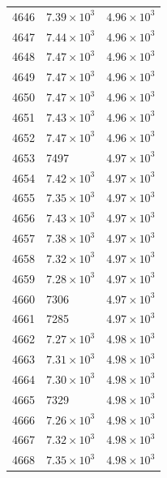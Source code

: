 \begin{table}[H]
\begin{tabular}{lll}
4646 & $\displaystyle 7.39 \times 10^{3}$ & $\displaystyle 4.96 \times 10^{3}$ \\
4647 & $\displaystyle 7.44 \times 10^{3}$ & $\displaystyle 4.96 \times 10^{3}$ \\
4648 & $\displaystyle 7.47 \times 10^{3}$ & $\displaystyle 4.96 \times 10^{3}$ \\
4649 & $\displaystyle 7.47 \times 10^{3}$ & $\displaystyle 4.96 \times 10^{3}$ \\
4650 & $\displaystyle 7.47 \times 10^{3}$ & $\displaystyle 4.96 \times 10^{3}$ \\
4651 & $\displaystyle 7.43 \times 10^{3}$ & $\displaystyle 4.96 \times 10^{3}$ \\
4652 & $\displaystyle 7.47 \times 10^{3}$ & $\displaystyle 4.96 \times 10^{3}$ \\
4653 & 7497 & $\displaystyle 4.97 \times 10^{3}$ \\
4654 & $\displaystyle 7.42 \times 10^{3}$ & $\displaystyle 4.97 \times 10^{3}$ \\
4655 & $\displaystyle 7.35 \times 10^{3}$ & $\displaystyle 4.97 \times 10^{3}$ \\
4656 & $\displaystyle 7.43 \times 10^{3}$ & $\displaystyle 4.97 \times 10^{3}$ \\
4657 & $\displaystyle 7.38 \times 10^{3}$ & $\displaystyle 4.97 \times 10^{3}$ \\
4658 & $\displaystyle 7.32 \times 10^{3}$ & $\displaystyle 4.97 \times 10^{3}$ \\
4659 & $\displaystyle 7.28 \times 10^{3}$ & $\displaystyle 4.97 \times 10^{3}$ \\
4660 & 7306 & $\displaystyle 4.97 \times 10^{3}$ \\
4661 & 7285 & $\displaystyle 4.97 \times 10^{3}$ \\
4662 & $\displaystyle 7.27 \times 10^{3}$ & $\displaystyle 4.98 \times 10^{3}$ \\
4663 & $\displaystyle 7.31 \times 10^{3}$ & $\displaystyle 4.98 \times 10^{3}$ \\
4664 & $\displaystyle 7.30 \times 10^{3}$ & $\displaystyle 4.98 \times 10^{3}$ \\
4665 & 7329 & $\displaystyle 4.98 \times 10^{3}$ \\
4666 & $\displaystyle 7.26 \times 10^{3}$ & $\displaystyle 4.98 \times 10^{3}$ \\
4667 & $\displaystyle 7.32 \times 10^{3}$ & $\displaystyle 4.98 \times 10^{3}$ \\
4668 & $\displaystyle 7.35 \times 10^{3}$ & $\displaystyle 4.98 \times 10^{3}$ \\

\end{tabular}
\end{table}
